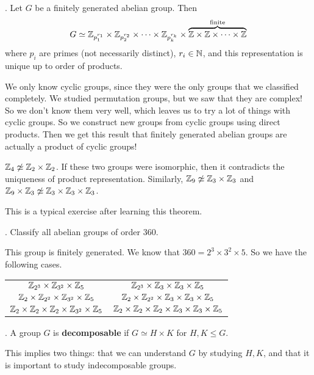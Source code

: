 \thm.  Let \(G\) be a finitely generated abelian group. Then
\[
    G \simeq\mathbb{Z}_{p_1^{r_1}} \times \mathbb{Z}_{p_2^{r_2}} \times \cdots \times \mathbb{Z}_{p_k^{r_k}} \times \overbrace{\mathbb{Z} \times \mathbb{Z} \times \cdots \times \mathbb{Z}}^{\text{finite}}
\]
where \(p_i\) are primes (not necessarily distinct), \(r_i \in \mathbb{N}\), and this representation is unique up to order of products.

We only know cyclic groups, since they were the only groups that we classified completely. We studied permutation groups, but we saw that they are complex! So we don't know them very well, which leaves us to try a lot of things with cyclic groups. So we construct new groups from cyclic groups using direct products. Then we get this result that finitely generated abelian groups are actually a product of cyclic groups!

\rmk \(\mathbb{Z}_4 \not\simeq \mathbb{Z}_2 \times \mathbb{Z}_2\). If these two groups were isomorphic, then it contradicts the uniqueness of product representation. Similarly, \(\mathbb{Z}_9 \not\simeq \mathbb{Z}_3 \times \mathbb{Z}_3\) and \(\mathbb{Z}_9 \times \mathbb{Z}_3 \not\simeq \mathbb{Z}_3 \times \mathbb{Z}_3 \times \mathbb{Z}_3\).

This is a typical exercise after learning this theorem.

\prob. Classify all abelian groups of order 360.

\pf This group is finitely generated. We know that \(360 = 2^3 \times 3^2 \times 5\). So we have the following cases.
\begin{center}
    \begin{tabular}{cc}
        \(\mathbb{Z}_{2^3} \times \mathbb{Z}_{3^2} \times \mathbb{Z}_5\)                           & \(\mathbb{Z}_{2^3} \times \mathbb{Z}_3 \times \mathbb{Z}_3 \times \mathbb{Z}_5\)                           \\
        \(\mathbb{Z}_{2} \times \mathbb{Z}_{2^2} \times \mathbb{Z}_{3^2} \times \mathbb{Z}_5\)             & \(\mathbb{Z}_{2} \times \mathbb{Z}_{2^2} \times \mathbb{Z}_3 \times \mathbb{Z}_3 \times \mathbb{Z}_5\)             \\
        \(\mathbb{Z}_{2} \times \mathbb{Z}_{2} \times \mathbb{Z}_{2} \times \mathbb{Z}_{3^2} \times \mathbb{Z}_5\) & \(\mathbb{Z}_{2} \times \mathbb{Z}_{2} \times \mathbb{Z}_{2} \times \mathbb{Z}_3 \times \mathbb{Z}_3 \times \mathbb{Z}_5\)
    \end{tabular}
\end{center}

.  A group \(G\) is \textbf{decomposable} if \(G \simeq H \times K\) for \(H, K \leq G\).

This implies two things: that we can understand \(G\) by studying \(H, K\), and that it is important to study indecomposable groups.


